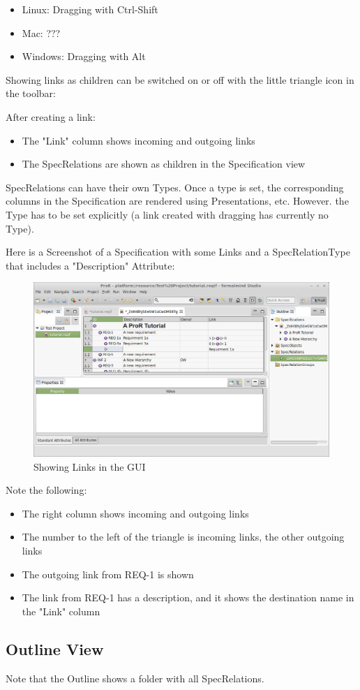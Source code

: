 \begin{itemize}

\item
  Linux: Dragging with Ctrl-Shift
\item
  Mac: ???
\item
  Windows: Dragging with Alt
\end{itemize}

Showing links as children can be switched on or off with the little
triangle icon in the toolbar:

After creating a link:

\begin{itemize}
\item
  The "Link" column shows incoming and outgoing links
\item
  The SpecRelations are shown as children in the Specification view
\end{itemize}

SpecRelations can have their own Types.  Once a type is set, the
corresponding columns in the Specification are rendered using
Presentations, etc.  However.  the Type has to be set explicitly (a link
created with dragging has currently no Type).

Here is a Screenshot of a Specification with some Links and a
SpecRelationType that includes a "Description" Attribute:

\begin{figure}[h!]      
\centering      
\includegraphics[width=\linewidth]{../rmf-images/links.png}      
\caption{Showing Links in the GUI}      
\label{fig:linksInGui}
\end{figure}

Note the following:

\begin{itemize}
\item
  The right column shows incoming and outgoing links
\item
  The number to the left of the triangle is incoming links, the other
  outgoing links
\item
  The outgoing link from REQ-1 is shown
\item
  The link from REQ-1 has a description, and it shows the destination
  name in the "Link" column
\end{itemize}

\subsection{Outline View}

Note that the Outline shows a folder with all SpecRelations.

